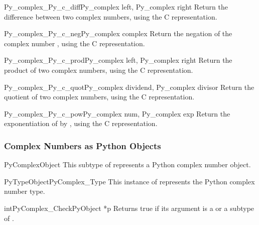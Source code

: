 \begin{cfuncdesc}{Py_complex}{_Py_c_diff}{Py_complex left, Py_complex right}
  Return the difference between two complex numbers, using the C
   representation.
\end{cfuncdesc}

\begin{cfuncdesc}{Py_complex}{_Py_c_neg}{Py_complex complex}
  Return the negation of the complex number , using the C
   representation.
\end{cfuncdesc}

\begin{cfuncdesc}{Py_complex}{_Py_c_prod}{Py_complex left, Py_complex right}
  Return the product of two complex numbers, using the C
   representation.
\end{cfuncdesc}

\begin{cfuncdesc}{Py_complex}{_Py_c_quot}{Py_complex dividend,
                                          Py_complex divisor}
  Return the quotient of two complex numbers, using the C
   representation.
\end{cfuncdesc}

\begin{cfuncdesc}{Py_complex}{_Py_c_pow}{Py_complex num, Py_complex exp}
  Return the exponentiation of  by , using the C
   representation.
\end{cfuncdesc}


\subsubsection{Complex Numbers as Python Objects}

\begin{ctypedesc}{PyComplexObject}
  This subtype of  represents a Python complex number
  object.
\end{ctypedesc}

\begin{cvardesc}{PyTypeObject}{PyComplex_Type}
  This instance of  represents the Python complex
  number type.
\end{cvardesc}

\begin{cfuncdesc}{int}{PyComplex_Check}{PyObject *p}
  Returns true if its argument is a  or a
  subtype of .
\end{cfuncdesc}

